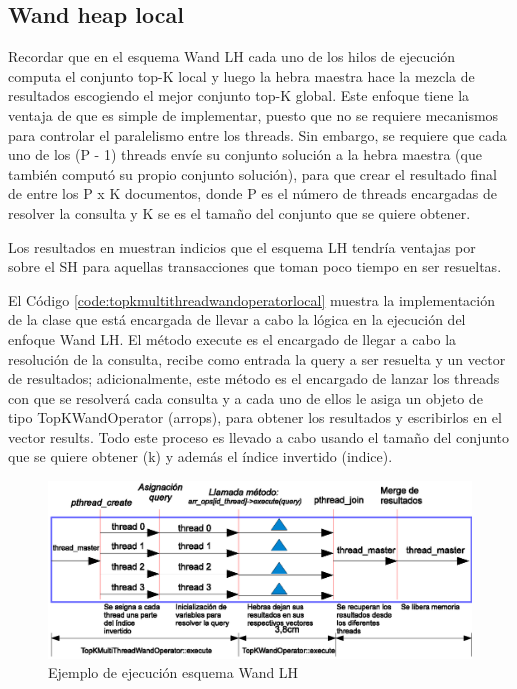 \subsection{Wand heap local}
\label{evaluacionexperimental:wlh}
Recordar que en el esquema Wand LH cada uno de los hilos de ejecución computa el conjunto top-K local y luego la hebra maestra hace la mezcla de resultados escogiendo el mejor conjunto top-K global. Este enfoque tiene la ventaja de que es simple de implementar, puesto que no se requiere mecanismos para controlar el paralelismo entre los threads. Sin embargo, se requiere que cada uno de los (P - 1) threads envíe su conjunto solución a la hebra maestra (que también computó su propio conjunto solución), para que crear el resultado final de entre los P x K documentos, donde P es el número de threads encargadas de resolver la consulta y K se es el tamaño del conjunto que se quiere obtener. 

Los resultados en \citep{Rojas:2013} muestran indicios que el esquema LH tendría ventajas por sobre el SH para aquellas transacciones que toman poco tiempo en ser resueltas. 

El Código \ref{code:topkmultithreadwandoperatorlocal} muestra la implementación de la clase que está encargada de llevar a cabo la lógica en la ejecución del enfoque Wand LH. El método execute es el encargado de llegar a cabo la resolución de la consulta, recibe como entrada la query a ser resuelta y un vector de resultados; adicionalmente, este método es el encargado de lanzar los threads con que se resolverá cada consulta y a cada uno de ellos le asiga un objeto de tipo TopKWandOperator (arrops), para obtener los resultados y escribirlos en el vector results. Todo este proceso es llevado a cabo usando el tamaño del conjunto que se quiere obtener (k) y además el índice invertido (indice).


\begin{figure}[!th]
\centering
\includegraphics[scale=.75]{images/ejecucion_wandlh.eps}
\caption{Ejemplo de ejecución esquema Wand LH}
\label{fig:ejecucion_wandlh}
\end{figure}

